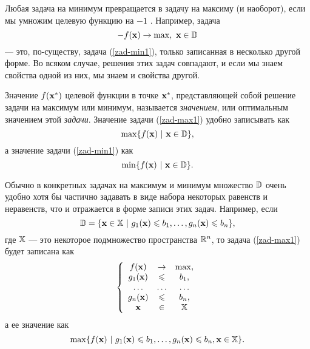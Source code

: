     Любая задача
    на минимум превращается в задачу на максиму (и наоборот), если мы умножим
    целевую функцию на $-1$ . Например, задача
    \[-f(\vc{x})\rightarrow\max,\ \vc{x}\in\st{D}\]
    --- это, по-существу, задача (\ref{zad-min1}), только записанная
    в несколько другой форме. Во всяком случае, решения этих задач
    совпадают, и если мы знаем свойства одной из них, мы знаем и свойства
    другой.

    Значение $f(\mathbf{x^{*}})$ целевой функции в точке $\mathbf{x^{*}}$, представляющей собой
    решение задачи на максимум или минимум, называется \emph{значением}, или оптимальным
    значением этой \emph{задачи}. Значение задачи (\ref{zad-max1}) удобно
    записывать как
    \[\max\{f(\mathbf{x})\ |\ \mathbf{x}\in\mathbb{D}\},\]
    а значение задачи (\ref{zad-min1}) как
    \[\min\{f(\vc{x})\ |\ \vc{x}\in\st{D}\}.\]

    Обычно в конкретных задачах на максимум и минимум множество
    $\mathbb{D}$ очень удобно хотя бы частично задавать в виде
    набора некоторых равенств и неравенств,
    что и отражается в форме записи этих задач. Например, если
    \[\st{D}=\{\vc{x}\in \st{X}\ |\ g_{1}(\vc{x})\leqslant b_{1},
    \ldots,g_{n}(\vc{x})\leqslant b_{n}\}, \]
    где $\mathbb{X}$ --- это некоторое подмножество пространства
    $\mathbb{R}^{n}$,  то задача (\ref{zad-max1}) будет записана как
\begin{equation} \label{zad-max-ogr}
    \left\{
    \begin{array}{ccc}
      f(\mathbf{x}) & \rightarrow & \max, \\
      g_{1}(\mathbf{x})& \leqslant & b_{1}, \\
      \ldots & \ldots & \ldots \\
      g_{n}(\mathbf{x})& \leqslant & b_{n},\\
      \mathbf{x} & \in & \mathbb{X}\\
    \end{array}
    \right.
\end{equation}
    а ее значение как
    \[\max\{f(\mathbf{x})\ |\ g_{1}(\mathbf{x})\leqslant b_{1},
    \ldots,g_{n}(\mathbf{x})\leqslant b_{n}, \mathbf{x}\in\mathbb{X}\}.\]

